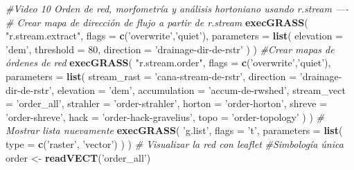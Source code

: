 \documentclass[11pt,]{article}
\newenvironment{Shaded}{\begin{snugshade}}{\end{snugshade}}
\newcommand{\KeywordTok}[1]{\textcolor[rgb]{0.13,0.29,0.53}{\textbf{#1}}}
\newcommand{\DataTypeTok}[1]{\textcolor[rgb]{0.13,0.29,0.53}{#1}}
\newcommand{\DecValTok}[1]{\textcolor[rgb]{0.00,0.00,0.81}{#1}}
\newcommand{\StringTok}[1]{\textcolor[rgb]{0.31,0.60,0.02}{#1}}
\newcommand{\CommentTok}[1]{\textcolor[rgb]{0.56,0.35,0.01}{\textit{#1}}}
\newcommand{\NormalTok}[1]{#1}
\begin{document}
\begin{Shaded}
\begin{Highlighting}[]
\CommentTok{#Video 10 Orden de red, morfometría y análisis hortoniano usando r.stream ----}
\CommentTok{# Crear mapa de dirección de flujo a partir de r.stream}
\KeywordTok{execGRASS}\NormalTok{(}
  \StringTok{"r.stream.extract"}\NormalTok{,}
  \DataTypeTok{flags =} \KeywordTok{c}\NormalTok{(}\StringTok{'overwrite'}\NormalTok{,}\StringTok{'quiet'}\NormalTok{),}
  \DataTypeTok{parameters =} \KeywordTok{list}\NormalTok{(}
    \DataTypeTok{elevation =} \StringTok{'dem'}\NormalTok{,}
    \DataTypeTok{threshold =} \DecValTok{80}\NormalTok{,}
    \DataTypeTok{direction =} \StringTok{'drainage-dir-de-rstr'}
\NormalTok{  )}
\NormalTok{)}
\CommentTok{#Crear mapas de órdenes de red}
\KeywordTok{execGRASS}\NormalTok{(}
  \StringTok{"r.stream.order"}\NormalTok{,}
  \DataTypeTok{flags =} \KeywordTok{c}\NormalTok{(}\StringTok{'overwrite'}\NormalTok{,}\StringTok{'quiet'}\NormalTok{),}
  \DataTypeTok{parameters =} \KeywordTok{list}\NormalTok{(}
    \DataTypeTok{stream_rast =} \StringTok{'cana-stream-de-rstr'}\NormalTok{,}
    \DataTypeTok{direction =} \StringTok{'drainage-dir-de-rstr'}\NormalTok{,}
    \DataTypeTok{elevation =} \StringTok{'dem'}\NormalTok{,}
    \DataTypeTok{accumulation =} \StringTok{'accum-de-rwshed'}\NormalTok{,}
    \DataTypeTok{stream_vect =} \StringTok{'order_all'}\NormalTok{,}
    \DataTypeTok{strahler =} \StringTok{'order-strahler'}\NormalTok{,}
    \DataTypeTok{horton =} \StringTok{'order-horton'}\NormalTok{,}
    \DataTypeTok{shreve =} \StringTok{'order-shreve'}\NormalTok{,}
    \DataTypeTok{hack =} \StringTok{'order-hack-gravelius'}\NormalTok{,}
    \DataTypeTok{topo =} \StringTok{'order-topology'}
\NormalTok{  )}
\NormalTok{)}
\CommentTok{# Mostrar lista nuevamente}
\KeywordTok{execGRASS}\NormalTok{(}
  \StringTok{'g.list'}\NormalTok{,}
  \DataTypeTok{flags =} \StringTok{'t'}\NormalTok{,}
  \DataTypeTok{parameters =} \KeywordTok{list}\NormalTok{(}
    \DataTypeTok{type =} \KeywordTok{c}\NormalTok{(}\StringTok{'raster'}\NormalTok{, }\StringTok{'vector'}\NormalTok{)}
\NormalTok{  )}
\NormalTok{)}
\CommentTok{# Visualizar la red con leaflet}
\CommentTok{#Simbología única}
\NormalTok{order <-}\StringTok{ }\KeywordTok{readVECT}\NormalTok{(}\StringTok{'order_all'}\NormalTok{)}


\end{Highlighting}
\end{Shaded}
\end{document}
